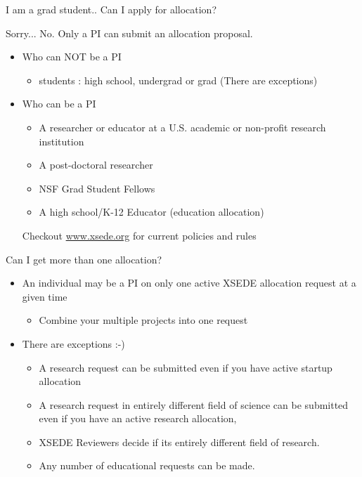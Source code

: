 \documentclass[compress,10pt]{beamer}
\begin{document}
\begin{frame}{I am a grad student.. Can I apply for allocation?}
\pause

Sorry... No.
\bigskip
\pause
Only a PI can submit an allocation proposal.

\bigskip
  
\begin{itemize}
\pause
\item Who can NOT be a PI
\pause
         \begin{itemize}
           \item students : high school, undergrad or grad (There are exceptions)
           
         \end{itemize}
 
 \pause
    \item Who can be a PI
      \begin{itemize}
      \pause
        \item A researcher or educator at a U.S. academic or non-profit research institution
        \pause
        \item A post-doctoral researcher
        \pause
        \item NSF Grad Student Fellows
        \pause
        \item A high school/K-12 Educator (education allocation)
      \end{itemize}
      
     
 
    \bigskip
    \pause
    Checkout \url{www.xsede.org} for current policies and rules
 
  
\end{itemize}
\end{frame}


\begin{frame}{Can I get more than one allocation?}
\begin{itemize}
\pause
 \item An individual may be a PI on only one active XSEDE allocation request at a given time
  \begin{itemize}
  \pause
  \item Combine your multiple projects into one request
  \end{itemize}
  \pause
  \item There are exceptions :-)
  \pause
  \begin{itemize}
  \item A research request can be submitted even if you have active startup allocation
  \pause
  \item A research request in entirely different field of science can be submitted even if you have an active research allocation,\\
  \item XSEDE Reviewers decide if its entirely different field of research.
  \pause
  \item Any number of educational requests can be made.
  \end{itemize}
  
  \end{itemize}
\end{frame}
\end{document}
